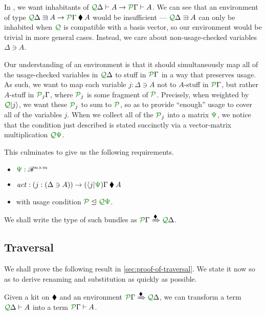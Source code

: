 \documentclass[submission,copyright,creativecommons]{eptcs}
\begin{document}
In \name, we want inhabitants of
$\ctx{\Delta}{Q} \vdash A \to \ctx{\Gamma}{P} \vdash A$.
We can see that an environment of type
$\ctx{\Delta}{Q} \lvar A \to \ctx{\Gamma}{P} \kitrel A$ would
be insufficient --- $\ctx{\Delta}{Q} \lvar A$ can only be inhabited when
$\resctx Q$ is compatible with a basis vector, so our environment would be
trivial in more general cases.
Instead, we care about non-usage-checked variables $\Delta \ni A$.

Our understanding of an environment is that it should simultaneously map all of
the usage-checked variables in $\ctx{\Delta}{Q}$ to stuff in $\ctx{\Gamma}{P}$
in a way that preserves usage.
As such, we want to map each variable $j : \Delta \ni A$ not to $A$-stuff in
$\ctx{\Gamma}{P}$, but rather $A$-stuff in $\resctx P_j\Gamma$,
where $\resctx P_j$ is some fragment of $\resctx P$.
Precisely, when weighted by $\resctx Q\lvert j \rangle$, we want these
$\resctx P_j$ to sum to $\resctx P$, so as to provide ``enough'' usage to cover
all of the variables $j$.
When we collect all of the $\resctx P_j$ into a matrix $\rescomment\Psi$, we
notice that the condition just described is stated succinctly via a
vector-matrix multiplication $\resctx Q\rescomment\Psi$.

This culminates to give us the following requirements.

\begin{itemize}
  \item $\rescomment\Psi : \mathscr R^{n \times m}$
  \item $\mathit{act} :
    (j : (\Delta \ni A)) \to (\langle j \rvert\rescomment\Psi)\Gamma \kitrel A$
  \item with usage condition $\resctx P \subres \resctx Q \rescomment\Psi$.
\end{itemize}

We shall write the type of such bundles as
$\ctx{\Gamma}{P} \subst{\kitrel} \ctx{\Delta}{Q}$.

\subsection{Traversal}

We shall prove the following result in \autoref{sec:proof-of-traversal}.
We state it now so as to derive renaming and substitution as quickly as
possible.

\newcommand{\thmtrav}{%
  Given a kit on $\kitrel$ and an environment
  $\ctx{\Gamma}{P} \subst{\kitrel} \ctx{\Delta}{Q}$, we can transform a term
  $\ctx{\Delta}{Q} \vdash A$ into a term $\ctx{\Gamma}{P} \vdash A$.%
}
\begin{theorem}[traversal]\label{thm:trav}
  \thmtrav
\end{theorem}
\end{document}
